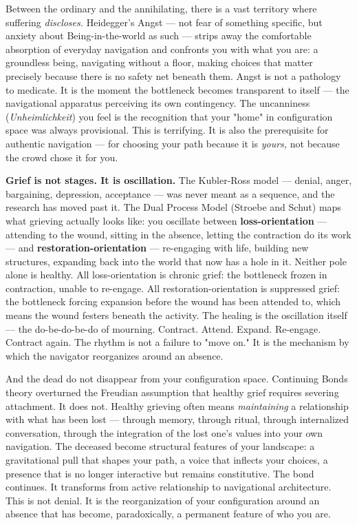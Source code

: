 Between the ordinary and the annihilating, there is a vast territory where suffering \textit{discloses.} Heidegger's Angst — not fear of something specific, but anxiety about Being-in-the-world as such — strips away the comfortable absorption of everyday navigation and confronts you with what you are: a groundless being, navigating without a floor, making choices that matter precisely because there is no safety net beneath them. Angst is not a pathology to medicate. It is the moment the bottleneck becomes transparent to itself — the navigational apparatus perceiving its own contingency. The uncanniness (\textit{Unheimlichkeit}) you feel is the recognition that your "home" in configuration space was always provisional. This is terrifying. It is also the prerequisite for authentic navigation — for choosing your path because it is \textit{yours,} not because the crowd chose it for you.


\textbf{Grief is not stages. It is oscillation.} The Kubler-Ross model — denial, anger, bargaining, depression, acceptance — was never meant as a sequence, and the research has moved past it. The Dual Process Model (Stroebe and Schut) maps what grieving actually looks like: you oscillate between \textbf{loss-orientation} — attending to the wound, sitting in the absence, letting the contraction do its work — and \textbf{restoration-orientation} — re-engaging with life, building new structures, expanding back into the world that now has a hole in it. Neither pole alone is healthy. All loss-orientation is chronic grief: the bottleneck frozen in contraction, unable to re-engage. All restoration-orientation is suppressed grief: the bottleneck forcing expansion before the wound has been attended to, which means the wound festers beneath the activity. The healing is the oscillation itself — the do-be-do-be-do of mourning. Contract. Attend. Expand. Re-engage. Contract again. The rhythm is not a failure to "move on." It is the mechanism by which the navigator reorganizes around an absence.


And the dead do not disappear from your configuration space. Continuing Bonds theory overturned the Freudian assumption that healthy grief requires severing attachment. It does not. Healthy grieving often means \textit{maintaining} a relationship with what has been lost — through memory, through ritual, through internalized conversation, through the integration of the lost one's values into your own navigation. The deceased become structural features of your landscape: a gravitational pull that shapes your path, a voice that inflects your choices, a presence that is no longer interactive but remains constitutive. The bond continues. It transforms from active relationship to navigational architecture. This is not denial. It is the reorganization of your configuration around an absence that has become, paradoxically, a permanent feature of who you are.


